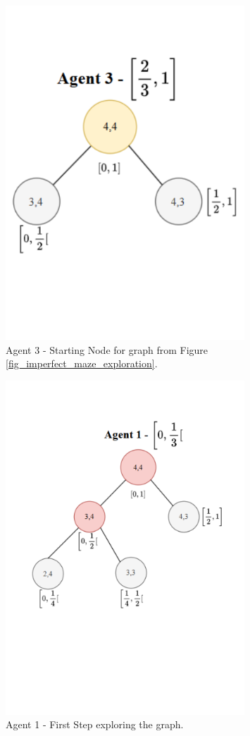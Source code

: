 \begin{figure}[H]
    \centering
    \includegraphics[width=0.8\textwidth]{ApeA/maze_agent_3_step_0.png}
    \caption{Agent 3 - Starting Node for graph from Figure \ref{fig_imperfect_maze_exploration}.}
    \label{fig_agent_3_step_0}
\end{figure}

\begin{figure}[H]
    \centering
    \includegraphics[width=0.8\textwidth]{ApeA/maze_agent_1_step_1.png}
    \caption{Agent 1 - First Step exploring the graph.}
    \label{fig_agent_1_step_1}
\end{figure}

